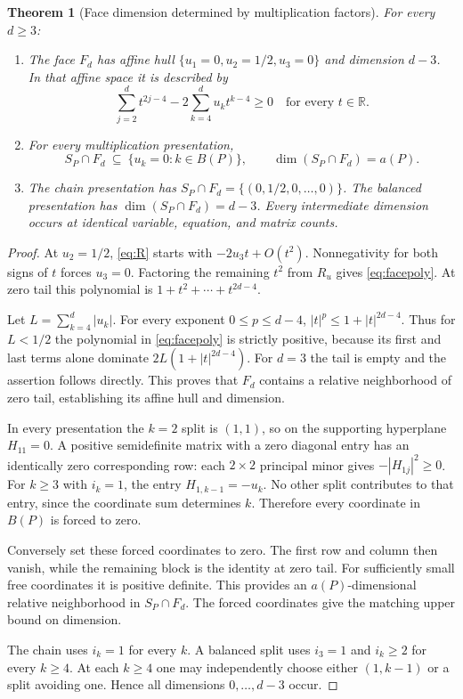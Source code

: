 \documentclass[11pt]{article}
\newtheorem{theorem}{Theorem}[section]
\theoremstyle{definition}\newtheorem{definition}[theorem]{Definition}
\theoremstyle{remark}\newtheorem{remark}[theorem]{Remark}
\newcommand{\R}{\mathbb{R}}
\begin{document}
\begin{theorem}[Face dimension determined by multiplication factors]\label{thm:face}
For every $d\ge3$:
\begin{enumerate}
\item The face $F_d$ has affine hull $\{u_1=0,u_2=1/2,u_3=0\}$ and dimension $d-3$. In that affine space it is described by
\begin{equation}\label{eq:facepoly}
 \sum_{j=2}^d t^{2j-4}-2\sum_{k=4}^d u_kt^{k-4}\ge0\quad\text{for every }t\in\R.
\end{equation}
\item For every multiplication presentation,
\begin{equation}\label{eq:forced}
 S_P\cap F_d\ \subseteq\ \{u_k=0:k\in B(P)\},\qquad
 \dim(S_P\cap F_d)=a(P).
\end{equation}
\item The chain presentation has $S_P\cap F_d=\{(0,1/2,0,\ldots,0)\}$. The balanced presentation has $\dim(S_P\cap F_d)=d-3$. Every intermediate dimension occurs at identical variable, equation, and matrix counts.
\end{enumerate}
\end{theorem}
\begin{proof}
At $u_2=1/2$, \eqref{eq:R} starts with $-2u_3t+O(t^2)$. Nonnegativity for both signs of $t$ forces $u_3=0$. Factoring the remaining $t^2$ from $R_u$ gives \eqref{eq:facepoly}. At zero tail this polynomial is $1+t^2+\cdots+t^{2d-4}$.

Let $L=\sum_{k=4}^d|u_k|$. For every exponent $0\le p\le d-4$, $|t|^p\le1+|t|^{2d-4}$. Thus for $L<1/2$ the polynomial in \eqref{eq:facepoly} is strictly positive, because its first and last terms alone dominate $2L(1+|t|^{2d-4})$. For $d=3$ the tail is empty and the assertion follows directly. This proves that $F_d$ contains a relative neighborhood of zero tail, establishing its affine hull and dimension.

In every presentation the $k=2$ split is $(1,1)$, so on the supporting hyperplane $H_{11}=0$. A positive semidefinite matrix with a zero diagonal entry has an identically zero corresponding row: each $2\times2$ principal minor gives $-|H_{1j}|^2\ge0$. For $k\ge3$ with $i_k=1$, the entry $H_{1,k-1}=-u_k$. No other split contributes to that entry, since the coordinate sum determines $k$. Therefore every coordinate in $B(P)$ is forced to zero.

Conversely set these forced coordinates to zero. The first row and column then vanish, while the remaining block is the identity at zero tail. For sufficiently small free coordinates it is positive definite. This provides an $a(P)$-dimensional relative neighborhood in $S_P\cap F_d$. The forced coordinates give the matching upper bound on dimension.

The chain uses $i_k=1$ for every $k$. A balanced split uses $i_3=1$ and $i_k\ge2$ for every $k\ge4$. At each $k\ge4$ one may independently choose either $(1,k-1)$ or a split avoiding one. Hence all dimensions $0,\ldots,d-3$ occur.
\end{proof}
\end{document}
